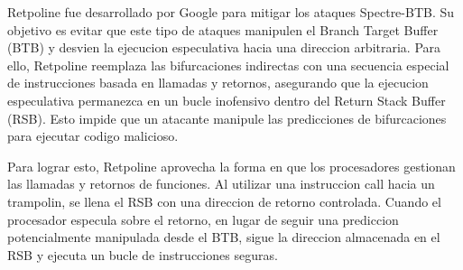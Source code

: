 \documentclass[lettersize,compsoc]{IEEEtran}
\begin{document}
Retpoline fue desarrollado por Google para mitigar los ataques Spectre-BTB. Su objetivo es evitar que este tipo de ataques manipulen el Branch Target Buffer (BTB) y desvien la ejecucion especulativa hacia una direccion arbitraria. Para ello, Retpoline reemplaza las bifurcaciones indirectas con una secuencia especial de instrucciones basada en llamadas y retornos, asegurando que la ejecucion especulativa permanezca en un bucle inofensivo dentro del Return Stack Buffer (RSB). Esto impide que un atacante manipule las predicciones de bifurcaciones para ejecutar codigo malicioso.

Para lograr esto, Retpoline aprovecha la forma en que los procesadores gestionan las llamadas y retornos de funciones. Al utilizar una instruccion call hacia un trampolin, se llena el RSB con una direccion de retorno controlada. Cuando el procesador especula sobre el retorno, en lugar de seguir una prediccion potencialmente manipulada desde el BTB, sigue la direccion almacenada en el RSB y ejecuta un bucle de instrucciones seguras.
\end{document}
